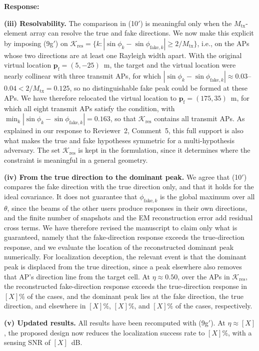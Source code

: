 \documentclass[a4paper,12pt]{article}
\newenvironment{response}{\par\textbf{Response:}\par}{\par}
\begin{document}
\begin{response}
\textbf{(iii) Resolvability.} The comparison in (10$'$) is meaningful only
when the $M_{\mathrm{tx}}$-element array can resolve the true and fake
directions. We now make this explicit by imposing (9g$'$) on
$\mathcal{K}_{\mathrm{res}}=\{k:|\sin\phi_k-\sin\phi_{\mathrm{fake},k}|\ge2/M_{\mathrm{tx}}\}$,
i.e., on the APs whose two directions are at least one Rayleigh width
apart. With the original virtual location
$\mathbf{p}_{\mathrm{f}}=(5,-25)$~m, the target and the virtual location
were nearly collinear with three transmit APs, for which
$|\sin\phi_k-\sin\phi_{\mathrm{fake},k}|\approx0.03$--$0.04<2/M_{\mathrm{tx}}=0.125$,
so no distinguishable fake peak could be formed at these APs. We have
therefore relocated the virtual location to
$\mathbf{p}_{\mathrm{f}}=(175,35)$~m, for which all eight transmit APs
satisfy the condition, with
$\min_k|\sin\phi_k-\sin\phi_{\mathrm{fake},k}|=0.163$, so that
$\mathcal{K}_{\mathrm{res}}$ contains all transmit APs. As explained in our
response to Reviewer~2, Comment~5, this full support is also what makes the
true and fake hypotheses symmetric for a multi-hypothesis adversary. The set
$\mathcal{K}_{\mathrm{res}}$ is kept in the formulation, since it determines
where the constraint is meaningful in a general geometry.

\textbf{(iv) From the true direction to the dominant peak.} We agree that
(10$'$) compares the fake direction with the true direction only, and that
it holds for the ideal covariance. It does not guarantee that
$\phi_{\mathrm{fake},k}$ is the global maximum over all $\theta$, since the
beams of the other users produce responses in their own directions, and the
finite number of snapshots and the EM reconstruction error add residual
cross terms. We have therefore revised the manuscript to claim only what is
guaranteed, namely that the fake-direction response exceeds the
true-direction response, and we evaluate the location of the reconstructed
dominant peak numerically. For localization deception, the relevant event is
that the dominant peak is displaced from the true direction, since a peak
elsewhere also removes that AP's direction line from the target cell. At
$\eta\approx0.50$, over the APs in $\mathcal{K}_{\mathrm{res}}$, the
reconstructed fake-direction response exceeds the true-direction response in
$[X]\%$ of the cases, and the dominant peak lies at the fake direction, the
true direction, and elsewhere in $[X]\%$, $[X]\%$, and $[X]\%$ of the cases,
respectively.

\textbf{(v) Updated results.} All results have been recomputed with
(9g$'$). At $\eta\approx[X]$, the proposed design now reduces the
localization success rate to $[X]\%$, with a sensing SNR of $[X]$~dB.
\end{response}
\end{document}
